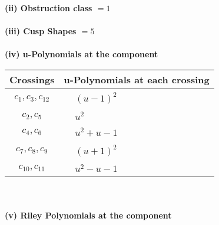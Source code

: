 \documentclass[1p]{elsarticle_modified}
\theoremstyle{definition}
\begin{document}
\flushleft \textbf{(ii) Obstruction class $= 1$}\\~\\
\flushleft \textbf{(iii) Cusp Shapes $= 5$}\\~\\
\newpage\renewcommand{\arraystretch}{1}
\flushleft \textbf{(iv) u-Polynomials at the component}\newline \\
\begin{tabular}{m{50pt}|m{274pt}}
Crossings & \hspace{64pt}u-Polynomials at each crossing \\
\hline $$\begin{aligned}c_{1},c_{3},c_{12}\end{aligned}$$&$\begin{aligned}
&(u-1)^2
\end{aligned}$\\
\hline $$\begin{aligned}c_{2},c_{5}\end{aligned}$$&$\begin{aligned}
&u^2
\end{aligned}$\\
\hline $$\begin{aligned}c_{4},c_{6}\end{aligned}$$&$\begin{aligned}
&u^2+u-1
\end{aligned}$\\
\hline $$\begin{aligned}c_{7},c_{8},c_{9}\end{aligned}$$&$\begin{aligned}
&(u+1)^2
\end{aligned}$\\
\hline $$\begin{aligned}c_{10},c_{11}\end{aligned}$$&$\begin{aligned}
&u^2- u-1
\end{aligned}$\\
\hline
\end{tabular}\\~\\
\newpage\renewcommand{\arraystretch}{1}
\flushleft \textbf{(v) Riley Polynomials at the component}\newline \\
\end{document}
